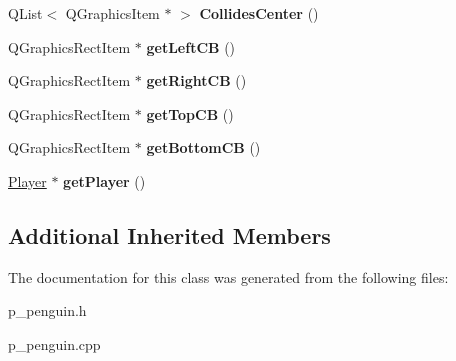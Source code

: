 \begin{DoxyCompactItemize}
\item 
\hypertarget{class_pingouin_a10126ab2598c56da1fe96bae1bedf9a7}{}Q\+List$<$ Q\+Graphics\+Item $\ast$ $>$ {\bfseries Collides\+Center} ()\label{class_pingouin_a10126ab2598c56da1fe96bae1bedf9a7}

\item 
\hypertarget{class_pingouin_aaa130c988fb99be84ae8ce057ff0466f}{}Q\+Graphics\+Rect\+Item $\ast$ {\bfseries get\+Left\+C\+B} ()\label{class_pingouin_aaa130c988fb99be84ae8ce057ff0466f}

\item 
\hypertarget{class_pingouin_a840603a098f62619f3cf6aef3ff71500}{}Q\+Graphics\+Rect\+Item $\ast$ {\bfseries get\+Right\+C\+B} ()\label{class_pingouin_a840603a098f62619f3cf6aef3ff71500}

\item 
\hypertarget{class_pingouin_a04bb88b6251aa853e1980c35005f7df8}{}Q\+Graphics\+Rect\+Item $\ast$ {\bfseries get\+Top\+C\+B} ()\label{class_pingouin_a04bb88b6251aa853e1980c35005f7df8}

\item 
\hypertarget{class_pingouin_aafa634e4ec962a442b5a4fdf1d029464}{}Q\+Graphics\+Rect\+Item $\ast$ {\bfseries get\+Bottom\+C\+B} ()\label{class_pingouin_aafa634e4ec962a442b5a4fdf1d029464}

\item 
\hypertarget{class_pingouin_ae8bf1799a91f7c7863731ddcfe1b1418}{}\hyperlink{class_player}{Player} $\ast$ {\bfseries get\+Player} ()\label{class_pingouin_ae8bf1799a91f7c7863731ddcfe1b1418}

\end{DoxyCompactItemize}
\subsection*{Additional Inherited Members}


The documentation for this class was generated from the following files\+:\begin{DoxyCompactItemize}
\item 
p\+\_\+penguin.\+h\item 
p\+\_\+penguin.\+cpp\end{DoxyCompactItemize}
